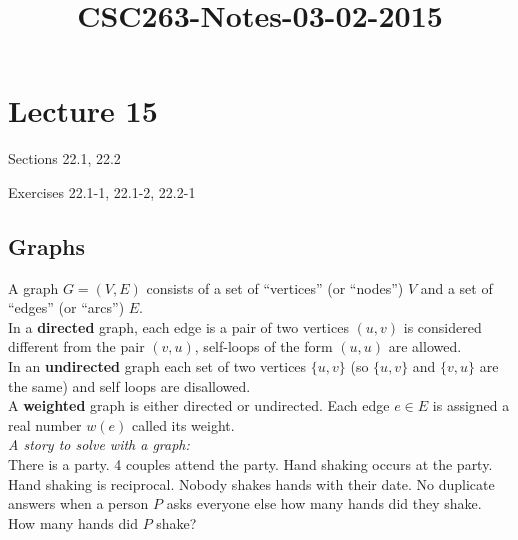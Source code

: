 



\title{CSC263-Notes-03-02-2015}



\section*{Lecture 15}

\reversemarginpar
\mpreadings

\noindent Sections 22.1, 22.2 \\

\mpselftest

\noindent Exercises 22.1-1, 22.1-2, 22.2-1

\subsection*{Graphs}

\noindent A graph $G=(V,E)$ consists of a set of ``vertices'' (or ``nodes'') $V$ and
a set of ``edges'' (or ``arcs'') $E$. \\

\noindent In a \textbf{directed} graph, each edge is a pair of two vertices $(u,v)$ is considered
different from the pair $(v,u)$, self-loops of the form $(u,u)$ are allowed. \\

\noindent In an \textbf{undirected} graph each set of two vertices $\{u,v\}$ (so $\{u,v\}$ and
$\{v,u\}$ are the same) and self loops are disallowed. \\

\noindent A \textbf{weighted} graph is either directed or undirected. Each edge $e \in E$ is assigned
a real number $w(e)$ called its weight. \\

\noindent \textit{A story to solve with a graph:} \\
There is a party. 4 couples attend the party. Hand shaking occurs at the party.
Hand shaking is reciprocal. Nobody shakes hands with their date. No duplicate answers
when a person $P$ asks everyone else how many hands did they shake. How many hands did $P$ shake? \\

